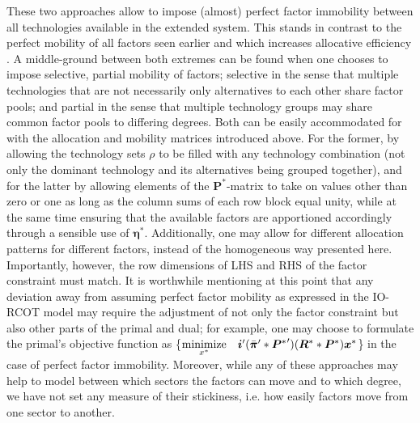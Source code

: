 \documentclass{article}
\begin{document}
\begin{refsection}
These two approaches allow to impose (almost) perfect factor immobility between all technologies available in the extended system. This stands in contrast to the perfect mobility of all factors seen earlier and which increases allocative efficiency \parencite{amores_2014}. A middle-ground between both extremes can be found when one chooses to impose selective, partial mobility of factors; selective in the sense that multiple technologies that are not necessarily only alternatives to each other share factor pools; and partial in the sense that multiple technology groups may share common factor pools to differing degrees. Both can be easily accommodated for with the allocation and mobility matrices introduced above. For the former, by allowing the technology sets $\rho$ to be filled with any technology combination (not only the dominant technology and its alternatives being grouped together), and for the latter by allowing elements of the $\bm{P}^{*}$-matrix to take on values other than zero or one as long as the column sums of each row block equal unity, while at the same time ensuring that the available factors are apportioned accordingly through a sensible use of $\bm{\eta}^{*}$. Additionally, one may allow for different allocation patterns for different factors, instead of the homogeneous way presented here. Importantly, however, the row dimensions of LHS and RHS of the factor constraint must match. It is worthwhile mentioning at this point that any deviation away from assuming perfect factor mobility as expressed in the IO-RCOT model may require the adjustment of not only the factor constraint but also other parts of the primal and dual; for example, one may choose to formulate the primal's objective function as \{$\underset{x^{*}}{\rm minimize} \quad \bm{i}' (\Bar{\bm{\pi}}' \ast {\bm{P}^{*}}^{\prime}) (\bm{R}^{*} \ast \bm{P}^{*}) \bm{x}^{*} $\} in the case of perfect factor immobility. Moreover, while any of these approaches may help to model between which sectors the factors can move and to which degree, we have not set any measure of their stickiness, i.e. how easily factors move from one sector to another.\footnotemark{}



\end{refsection}
\end{document}

